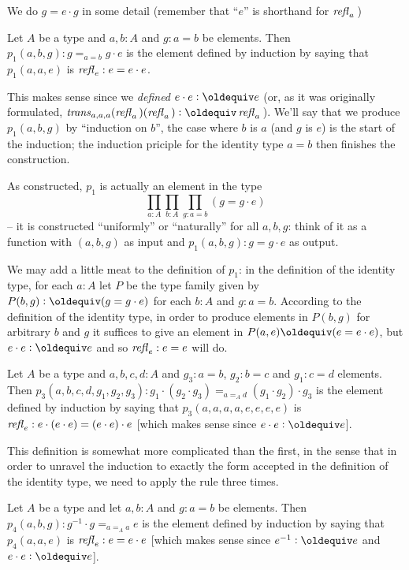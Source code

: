 We do $g=e\cdot g$ in some detail (remember that ``$e$'' is shorthand for $\mathop{{\it refl}_{a}}{}$)
\begin{definition}\label{def:p1}
  Let $A$ be a type and $a, b:A$ and $g:a=b$ be elements.  Then $p_1(a,b,g):g=_{a=b}g\cdot e$ is the element defined by induction by saying that $p_1(a,a,e)$ is $\mathop{{\it refl}_{e}}:e=e\cdot e$.
\end{definition}
\begin{remark}
  This makes sense since we \emph{defined} $e\cdot e\defequi e$ (or, as it was originally formulated, $\trans_{a,a,a}(\refl a{})(\refl a{})\defequi \refl a{}$).  We'll say that we produce $p_1(a,b,g)$ by ``induction on $b$'', the case where $b$ is $a$ (and $g$ is $e$) is the start of the induction; the induction priciple for the identity type $a=b$ then finishes the construction.

As constructed, $p_1$ is actually an element in the type
$$\prod_{a:A}\prod_{b:A}\prod_{g:a=b}(g=g\cdot e)$$ -- it is constructed ``uniformly'' or ``naturally'' for all $a,b,g$: think of it as a function with $(a,b,g)$ as input and $p_1(a,b,g):g=g\cdot e$ as output.

We may add a little meat to the definition of $p_1$: in the definition of the identity type, for each $a:A$ let $P$ be the type family given by $P(b,g)\defequi (g=g\cdot e)$ for each $b:A$ and $g:a=b$.  
According to the definition of the identity type, in order to produce elements in $P(b,g)$ for arbitrary $b$ and $g$ it suffices to give an element in $P(a,e)\oldequiv (e=e\cdot e)$, but $e\cdot e\defequi e$ and so $\mathop{{\it refl}_{e}}:e=e$ will do.
\end{remark}
\begin{definition}\label{def:p3}
  Let $A$ be a type and $a,b,c,d:A$ and $g_3:a=b$, $g_2:b=c$ and $g_1:c=d$ elements.  Then $p_3(a,b,c,d,g_1,g_2,g_3):g_1\cdot(g_2\cdot g_3)=_{a=_Ad}(g_1\cdot g_2)\cdot g_3$ is the element defined by induction by saying that $p_3(a,a,a,a,e,e,e,e)$ is $\mathop{{\it refl}_{e}}:e\cdot(e\cdot e)=(e\cdot e)\cdot e$ [which makes sense since $e\cdot e\defequi e$].
\end{definition}
\begin{remark}
  This definition is somewhat more complicated than the first, in the sense that in order to unravel the induction to exactly the form accepted in the definition of the identity type, we need to apply the rule three times.  %
\end{remark}
\begin{definition}\label{def:p4}
  Let $A$ be a type and let $a,b:A$ and $g:a=b$ be elements.  Then $p_4(a,b,g):g^{-1}\cdot g=_{a=_Aa} e$ is the element defined by induction by saying that $p_4(a,a,e)$ is $\mathop{{\it refl}_{e}}:e=e\cdot e$ [which makes sense since $e^{-1}\defequi e$ and $e\cdot e\defequi e$].
\end{definition}

